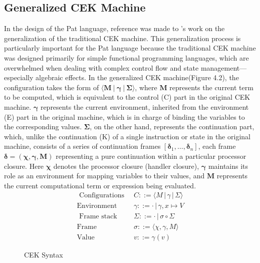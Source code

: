 \documentclass{l4proj}
\begin{document}
\subsection{Generalized CEK Machine}
In the design of the Pat language, reference was made to \cite{hillerstrm_2016_liberating}'s work on the generalization of the traditional CEK machine. This generalization process is particularly important for the Pat language because the traditional CEK machine was designed primarily for simple functional programming languages, which are overwhelmed when dealing with complex control flow and state management---especially algebraic effects. In the generalized CEK machine(Figure 4.2), the configuration takes the form of $\langle \boldsymbol{M}\: |\: \boldsymbol{\gamma} \:| \:\boldsymbol{\Sigma} \rangle$, where $\boldsymbol{M}$ represents the current term to be computed, which is equivalent to the control (C) part in the original CEK machine. $\boldsymbol{\gamma}$ represents the current environment, inherited from the environment (E) part in the original machine, which is in charge of binding the variables to the corresponding values. $\boldsymbol{\Sigma}$, on the other hand, represents the continuation part, which, unlike the continuation (K) of a single instruction or state in the original machine, consists of a series of continuation frames $[\boldsymbol{\delta}_1, \ldots , \boldsymbol{\delta}_n]$, each frame $\boldsymbol{\delta} = (\boldsymbol{\chi}, \boldsymbol{\gamma}, \boldsymbol{M})$ representing a pure continuation within a particular processor closure. Here $\boldsymbol{\chi}$ denotes the processor closure (handler closure), $\boldsymbol{\gamma}$ maintains its role as an environment for mapping variables to their values, and $\boldsymbol{M}$ represents the current computational term or expression being evaluated. 
\begin{align*}
\text{ Configurations}\;\; & C ::= \langle M \, | \, \gamma \, | \, \Sigma \rangle \\
\text{Environment}\;\; & \gamma ::= \cdot \, | \, \gamma, x \mapsto V \\
\text{ Frame stack}\;\; & \Sigma ::= \cdot \, | \, \sigma \circ \Sigma \\
\text{Frame}\;\; & \sigma ::= \langle \chi, \gamma, M \rangle \\
\text{Value}\;\; & v ::= \gamma(v) 
\end{align*}
\vspace{-2\baselineskip} 
\begin{figure}[ht]
    \caption{CEK Syntax}
    \label{fig:equations}
\end{figure}
\end{document}

